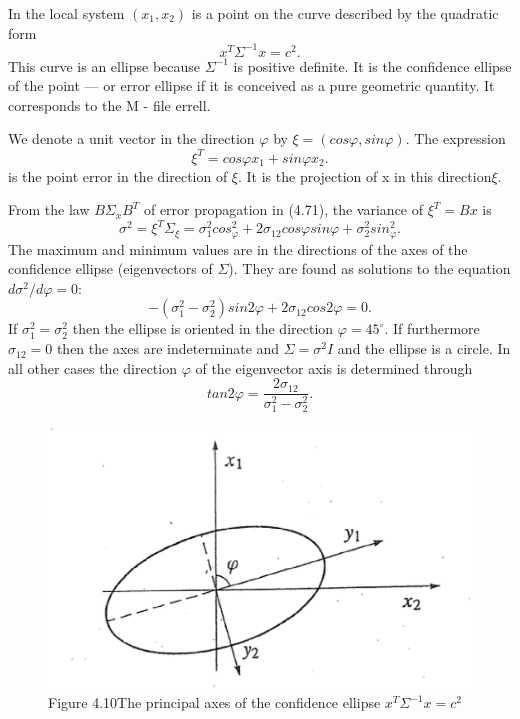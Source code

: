 In the local system $(x_1,x_2)$ is a point on the curve described by the quadratic form
\begin{equation}
x^T\Sigma^{-1}x=c^2.
\end{equation}
This curve is an ellipse because $\Sigma^{-1}$ is positive definite. It is the confidence ellipse of the point — or error ellipse if it is conceived as a pure geometric quantity. It corresponds to the M - file errell.

We denote a unit vector in the direction $\varphi$ by $\xi=(cos\varphi,sin\varphi)$. The expression
\begin{equation*}
\xi^T=cos\varphi x_1+sin\varphi x_2.
\end{equation*}
is the point error in the direction of $\xi$. It is the projection of x in this direction$\xi$.

From the law $B\Sigma_xB^T$ of error propagation in (4.71), the variance of $\xi^T=Bx$ is
\begin{equation}
\sigma^2=\xi^T\Sigma_{\xi}=\sigma^2_1cos^2_{\varphi}+2\sigma_{12}cos\varphi sin\varphi+\sigma^2_2sin^2_{\varphi}.
\end{equation}
The maximum and minimum values are in the directions of the axes of the confidence
ellipse (eigenvectors of $\Sigma$). They are found as solutions to the equation $d\sigma^2/d\varphi=0$:
\begin{equation*}
-(\sigma^2_1-\sigma^2_2)sin2\varphi+2\sigma_{12}cos2\varphi=0.
\end{equation*} 
If $\sigma^2_1=\sigma^2_2$ then the ellipse is oriented in the direction $\varphi=45^{\circ}$. If furthermore $\sigma_{12}=0$ then the axes are indeterminate and $\Sigma=\sigma^2I$ and the ellipse is a circle. In all other cases the direction $\varphi$ of the eigenvector axis is determined through
\begin{equation}
tan2\varphi=\frac{2\sigma_{12}}{\sigma^2_1-\sigma^2_2}.
\end{equation}

\begin{figure}[h]
	\centering
	\includegraphics[width=0.7\linewidth]{TeX_files/Part02/chapter04/image/4-10}
	\caption{Figure 4.10\;The principal axes of the confidence ellipse $x^T\Sigma^{-1}x=c^2$}
	\label{fig:4-10}
\end{figure}

